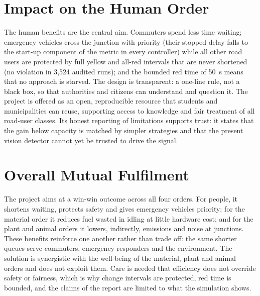 \section{Impact on the Human Order}
The human benefits are the central aim. Commuters spend less time waiting; emergency vehicles cross the junction with priority (their stopped delay falls to the start-up component of the metric in every controller) while all other road users are protected by full yellow and all-red intervals that are never shortened (no violation in 3,524 audited runs); and the bounded red time of 50~s means that no approach is starved. The design is transparent: a one-line rule, not a black box, so that authorities and citizens can understand and question it. The project is offered as an open, reproducible resource that students and municipalities can reuse, supporting access to knowledge and fair treatment of all road-user classes. Its honest reporting of limitations supports trust: it states that the gain below capacity is matched by simpler strategies and that the present vision detector cannot yet be trusted to drive the signal.

\section{Overall Mutual Fulfilment}
The project aims at a win-win outcome across all four orders. For people, it shortens waiting, protects safety and gives emergency vehicles priority; for the material order it reduces fuel wasted in idling at little hardware cost; and for the plant and animal orders it lowers, indirectly, emissions and noise at junctions. These benefits reinforce one another rather than trade off: the same shorter queues serve commuters, emergency responders and the environment. The solution is synergistic with the well-being of the material, plant and animal orders and does not exploit them. Care is needed that efficiency does not override safety or fairness, which is why change intervals are protected, red time is bounded, and the claims of the report are limited to what the simulation shows.
